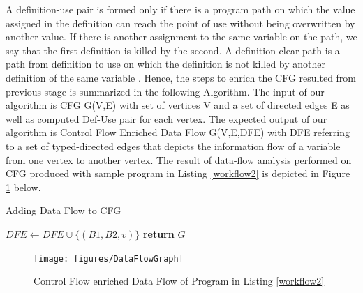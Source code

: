 A definition-use pair is formed only if there is a program path on which the value assigned in the definition can reach the point of use without being overwritten by another value. If there is another assignment to the same variable on the path, we say that the first definition is killed by the second. A definition-clear path is a path from definition to use on which the definition is not killed by another definition of the same variable \cite{young2008software}. Hence, the steps to enrich the CFG resulted from previous stage is summarized in the following Algorithm. The input of our algorithm is CFG G(V,E) with set of vertices V and a set of directed edges E as well as computed Def-Use pair for each vertex. The expected output of our algorithm is Control Flow Enriched Data Flow G(V,E,DFE) with DFE referring to a set of typed-directed edges that depicts the information flow of a variable from one vertex to another vertex. The result of data-flow analysis performed on CFG produced with sample program in Listing \ref{workflow2} is depicted in Figure \ref{fig:DFCFG} below.

\begin{algorithm}[h]

\caption{Adding Data Flow to CFG}\label{CFGDF}
\begin{algorithmic}[1]
      \State $DFE \gets DFE \cup \{(B1,B2,v)\} $
      \EndIf
\EndFor
\EndFor
\EndFor
\State \textbf{return} $G$
\EndProcedure
\end{algorithmic}
\end{algorithm}

\begin{figure}[h!]
\centering
\texttt{[image: figures/DataFlowGraph]}
\caption{Control Flow enriched Data Flow of Program in Listing \ref{workflow2}}
\label{fig:DFCFG}
\end{figure}

